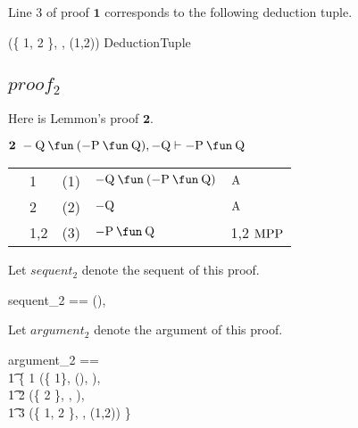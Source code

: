 \documentclass[11pt, oneside]{article}
\begin{document}
\begin{example}
Line 3 of proof $\mathbf{1}$ corresponds to the following deduction tuple.

\begin{zed}
	(\{ 1, 2 \}, \propQ, (1,2)) \in DeductionTuple
\end{zed}

\end{example}

\subsection{$proof_2$}

Here is Lemmon's proof $\mathbf{2}$.

\vspace{1ex}

$\mathbf{2}\ \notProp \propQ \impliesProp (\notProp \propP \impliesProp \propQ), \notProp \propQ \vdash \notProp \propP \impliesProp \propQ$

\vspace{1ex}

\begin{tabular}{l l r l l}
&	1	&	(1)	&	$\notProp \propQ \impliesProp (\notProp \propP \impliesProp \propQ)$	&	$\operatorname{A}$ \\
&	2	&	(2)	&	$- \mathrm{Q}$											&	$\operatorname{A}$ \\
&	1,2	&	(3)	&	$ \notProp \propP \impliesProp \propQ$							&	1,2 $\operatorname{MPP}$
\end{tabular}

\vspace{1ex}

Let $sequent_2$ denote the sequent of this proof.

\begin{zed}
	sequent_2 == \langle \notProp \propQ \impliesProp (\notProp \propP \impliesProp \propQ),  \notProp \propQ \rangle \sequent \notProp \propP \impliesProp \propQ
\end{zed}

Let $argument_2$ denote the argument of this proof.

\begin{zed}
	argument_2 == \\
	\t1	\{ 1 \mapsto (\{ 1\}, \notProp \propQ \impliesProp (\notProp \propP \impliesProp \propQ), ), \\
	\t1	2 \mapsto (\{ 2 \}, \notProp \propQ, ), \\
	\t1	3 \mapsto (\{ 1, 2 \}, \notProp \propP \impliesProp \propQ, (1,2)) \}
\end{zed}
\end{document}

